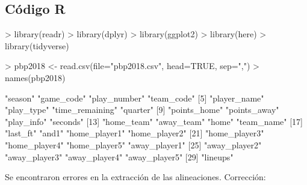 \documentclass[paper=a4, fontsize=9pt]{article}
\begin{document}
\clearpage

\subsection{Código R} \label{sec:Annexo2}

\begin{Schunk}
\begin{Sinput}
> library(readr)
> library(dplyr)
> library(ggplot2)
> library(here)
> library(tidyverse)
\end{Sinput}
\end{Schunk}

\begin{Schunk}
\begin{Sinput}
> pbp2018 <- read.csv(file="pbp2018.csv", head=TRUE, sep=",")
> names(pbp2018)
\end{Sinput}
\begin{Soutput}
 [1] "season"         "game_code"      "play_number"    "team_code"     
 [5] "player_name"    "play_type"      "time_remaining" "quarter"       
 [9] "points_home"    "points_away"    "play_info"      "seconds"       
[13] "home_team"      "away_team"      "home"           "team_name"     
[17] "last_ft"        "and1"           "home_player1"   "home_player2"  
[21] "home_player3"   "home_player4"   "home_player5"   "away_player1"  
[25] "away_player2"   "away_player3"   "away_player4"   "away_player5"  
[29] "lineups"       
\end{Soutput}
\end{Schunk}

Se encontraron errores en la extracción de las alineaciones. Corrección:
\end{document}
